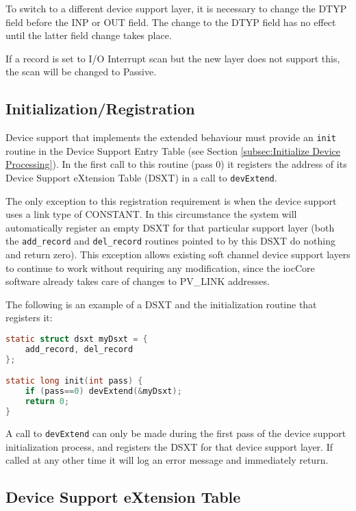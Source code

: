To switch to a different device support layer, it is necessary to change the DTYP field before the INP or OUT field.
The change to the DTYP field has no effect until the latter field change takes place.

If a record is set to I/O Interrupt scan but the new layer does not support this, the scan will be changed to Passive.

\subsection{Initialization/Registration}

Device support that implements the extended behaviour must provide an \verb|init| routine in the Device Support Entry Table (see Section \ref{subsec:Initialize Device Processing}).
In the first call to this routine (pass 0) it registers the address of its Device Support eXtension Table (DSXT) in a call to \verb|devExtend|.

The only exception to this registration requirement is when the device support uses a link type of CONSTANT.  In this 
circumstance the system will automatically register an empty DSXT for that particular support layer (both the 
\verb|add_record| and \verb|del_record| routines pointed to by this DSXT do nothing and return zero). This exception allows 
existing soft channel device support layers to continue to work without requiring any modification, since the iocCore 
software already takes care of changes to PV\_LINK addresses.

The following is an example of a DSXT and the initialization routine that registers it:

\begin{lstlisting}[language=C]
static struct dsxt myDsxt = {
    add_record, del_record
};

static long init(int pass) {
    if (pass==0) devExtend(&myDsxt);
    return 0;
}
\end{lstlisting}

A call to \verb|devExtend| can only be made during the first pass of the device support initialization process, and registers the DSXT for that device support layer.
If called at any other time it will log an error message and immediately return.

\subsection{Device Support eXtension Table}

